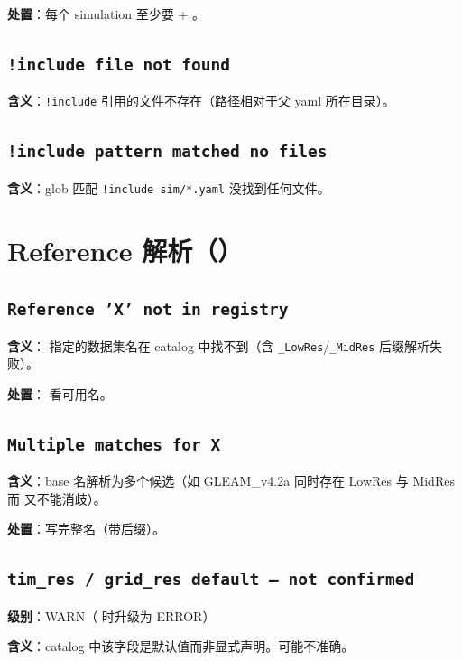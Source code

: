 \textbf{处置}：每个 simulation 至少要  + 。

\subsection{\texttt{!include file not found}}

\textbf{含义}：\texttt{!include} 引用的文件不存在（路径相对于父 yaml 所在目录）。

\subsection{\texttt{!include pattern matched no files}}

\textbf{含义}：glob 匹配 \texttt{!include sim/*.yaml} 没找到任何文件。

\section{Reference 解析（）}

\subsection{\texttt{Reference 'X' not in registry}}

\textbf{含义}： 指定的数据集名在 catalog 中找不到（含 \texttt{\_LowRes}/\texttt{\_MidRes} 后缀解析失败）。

\textbf{处置}： 看可用名。

\subsection{\texttt{Multiple matches for X}}

\textbf{含义}：base 名解析为多个候选（如 GLEAM\_v4.2a 同时存在 LowRes 与 MidRes 而  又不能消歧）。

\textbf{处置}：写完整名（带后缀）。

\subsection{\texttt{tim\_res / grid\_res default — not confirmed}}

\textbf{级别}：WARN（ 时升级为 ERROR）

\textbf{含义}：catalog 中该字段是默认值而非显式声明。可能不准确。

